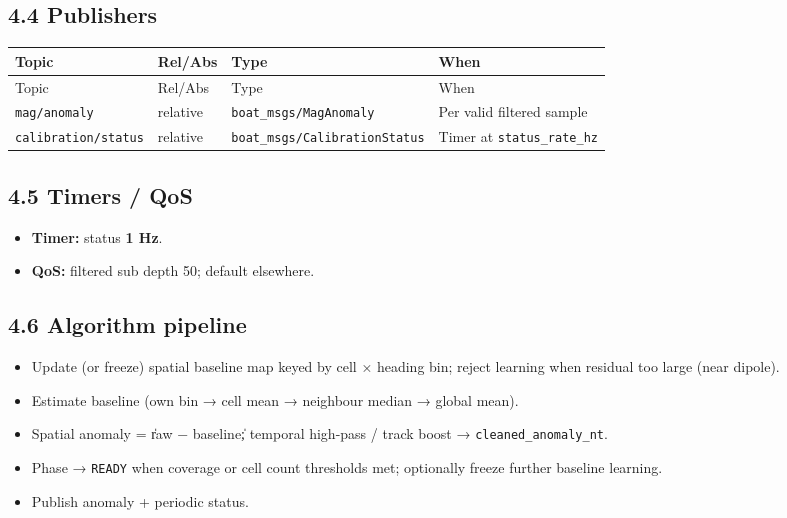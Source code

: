 \subsection{4.4 Publishers}


\begin{center}
\small
\begin{longtable}{@{}lllp{5.2cm}@{}}
\toprule
Topic & Rel/Abs & Type & When \\
\midrule
\endfirsthead
\toprule
Topic & Rel/Abs & Type & When \\
\midrule
\endhead
\texttt{mag/anomaly} & relative & \texttt{boat\_msgs/MagAnomaly} & Per valid filtered sample \\
\texttt{calibration/status} & relative & \texttt{boat\_msgs/CalibrationStatus} & Timer at \texttt{status\_rate\_hz} \\
\bottomrule
\end{longtable}
\end{center}


\subsection{4.5 Timers / QoS}


\begin{itemize}[leftmargin=*]
\item \textbf{Timer:} status \textbf{1 Hz}.
\item \textbf{QoS:} filtered sub depth 50; default elsewhere.
\end{itemize}


\subsection{4.6 Algorithm pipeline}


\begin{itemize}[leftmargin=*]
\item Update (or freeze) spatial baseline map keyed by cell × heading bin; reject learning when residual too large (near dipole).
\item Estimate baseline (own bin → cell mean → neighbour median → global mean).
\item Spatial anomaly = \|raw − baseline\|; temporal high-pass / track boost → \texttt{cleaned\_anomaly\_nt}.
\item Phase → \texttt{READY} when coverage or cell count thresholds met; optionally freeze further baseline learning.
\item Publish anomaly + periodic status.
\end{itemize}


